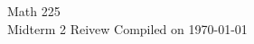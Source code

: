 \documentclass[11pt, letterpaper]{article}
\theoremstyle{definition}
\begin{document}
  \begin{titlepage}
    {\LARGE Math 225} \\ 
    {\large Midterm 2 Reivew}
    \vfill 
    Compiled on \today
  \end{titlepage}
  
  \begin{multicols}{3}
    
    
    
    
    
    
    
  \end{multicols}
\end{document}
